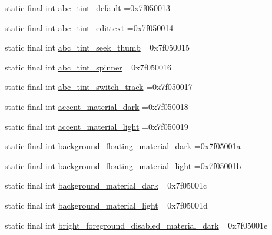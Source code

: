 \begin{DoxyCompactItemize}
\item 
static final int \mbox{\hyperlink{classcom_1_1example_1_1trainawearapplication_1_1_r_1_1color_a74e081ca0438f88c29691aaf9ffe9999}{abc\+\_\+tint\+\_\+default}} =0x7f050013
\item 
static final int \mbox{\hyperlink{classcom_1_1example_1_1trainawearapplication_1_1_r_1_1color_abd26df174d3d76637bbbaad21575208b}{abc\+\_\+tint\+\_\+edittext}} =0x7f050014
\item 
static final int \mbox{\hyperlink{classcom_1_1example_1_1trainawearapplication_1_1_r_1_1color_a248ed3510d743f351a67d4172e7f3f1e}{abc\+\_\+tint\+\_\+seek\+\_\+thumb}} =0x7f050015
\item 
static final int \mbox{\hyperlink{classcom_1_1example_1_1trainawearapplication_1_1_r_1_1color_a6b05abe89ee3762675d9b73a3d481765}{abc\+\_\+tint\+\_\+spinner}} =0x7f050016
\item 
static final int \mbox{\hyperlink{classcom_1_1example_1_1trainawearapplication_1_1_r_1_1color_a77c4ddae8f1d5362427fb22e6935a273}{abc\+\_\+tint\+\_\+switch\+\_\+track}} =0x7f050017
\item 
static final int \mbox{\hyperlink{classcom_1_1example_1_1trainawearapplication_1_1_r_1_1color_a11708e6a458734779b3f8d12969a2c8e}{accent\+\_\+material\+\_\+dark}} =0x7f050018
\item 
static final int \mbox{\hyperlink{classcom_1_1example_1_1trainawearapplication_1_1_r_1_1color_a055c004e50080672c5de46a98c1a6be0}{accent\+\_\+material\+\_\+light}} =0x7f050019
\item 
static final int \mbox{\hyperlink{classcom_1_1example_1_1trainawearapplication_1_1_r_1_1color_a3926fb5b931adb8f481128834e5c8160}{background\+\_\+floating\+\_\+material\+\_\+dark}} =0x7f05001a
\item 
static final int \mbox{\hyperlink{classcom_1_1example_1_1trainawearapplication_1_1_r_1_1color_a81b051e5c50c6bd2f079e79691fde58d}{background\+\_\+floating\+\_\+material\+\_\+light}} =0x7f05001b
\item 
static final int \mbox{\hyperlink{classcom_1_1example_1_1trainawearapplication_1_1_r_1_1color_ab794d257eddd805b8b2cebf571c54d90}{background\+\_\+material\+\_\+dark}} =0x7f05001c
\item 
static final int \mbox{\hyperlink{classcom_1_1example_1_1trainawearapplication_1_1_r_1_1color_a8d8beffb889dd5cfbfcd9e4e01d39241}{background\+\_\+material\+\_\+light}} =0x7f05001d
\item 
static final int \mbox{\hyperlink{classcom_1_1example_1_1trainawearapplication_1_1_r_1_1color_a0e6b2079cd70c5bcda40b66cb12953ef}{bright\+\_\+foreground\+\_\+disabled\+\_\+material\+\_\+dark}} =0x7f05001e

\end{DoxyCompactItemize}
